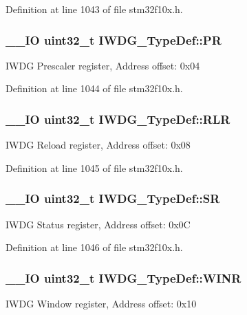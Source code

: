 Definition at line 1043 of file stm32f10x.\-h.

\hypertarget{struct_i_w_d_g___type_def_a5f2717885ff171e686e0347af9e6b68d}{
\subsubsection[{P\-R}]{\setlength{\rightskip}{0pt plus 5cm}\-\_\-\-\_\-\-I\-O {\bf uint32\-\_\-t} I\-W\-D\-G\-\_\-\-Type\-Def\-::\-P\-R}}\label{struct_i_w_d_g___type_def_a5f2717885ff171e686e0347af9e6b68d}
I\-W\-D\-G Prescaler register, Address offset\-: 0x04 

Definition at line 1044 of file stm32f10x.\-h.

\hypertarget{struct_i_w_d_g___type_def_aa3703eaa40e447dcacc69c0827595532}{
\subsubsection[{R\-L\-R}]{\setlength{\rightskip}{0pt plus 5cm}\-\_\-\-\_\-\-I\-O {\bf uint32\-\_\-t} I\-W\-D\-G\-\_\-\-Type\-Def\-::\-R\-L\-R}}\label{struct_i_w_d_g___type_def_aa3703eaa40e447dcacc69c0827595532}
I\-W\-D\-G Reload register, Address offset\-: 0x08 

Definition at line 1045 of file stm32f10x.\-h.

\hypertarget{struct_i_w_d_g___type_def_a9bbfbe921f2acfaf58251849bd0a511c}{
\subsubsection[{S\-R}]{\setlength{\rightskip}{0pt plus 5cm}\-\_\-\-\_\-\-I\-O {\bf uint32\-\_\-t} I\-W\-D\-G\-\_\-\-Type\-Def\-::\-S\-R}}\label{struct_i_w_d_g___type_def_a9bbfbe921f2acfaf58251849bd0a511c}
I\-W\-D\-G Status register, Address offset\-: 0x0\-C 

Definition at line 1046 of file stm32f10x.\-h.

\hypertarget{struct_i_w_d_g___type_def_a88aff7f1de0043ecf1667bd40b8c99d1}{
\subsubsection[{W\-I\-N\-R}]{\setlength{\rightskip}{0pt plus 5cm}\-\_\-\-\_\-\-I\-O {\bf uint32\-\_\-t} I\-W\-D\-G\-\_\-\-Type\-Def\-::\-W\-I\-N\-R}}\label{struct_i_w_d_g___type_def_a88aff7f1de0043ecf1667bd40b8c99d1}
I\-W\-D\-G Window register, Address offset\-: 0x10 

